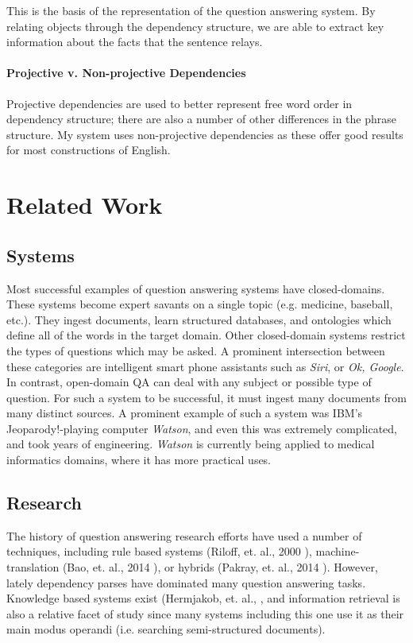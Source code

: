 \documentclass[twoside]{article}
\begin{document}
This is the basis of the representation of the question answering system.  By relating objects through the dependency structure, we are able to extract key information about the facts that the sentence relays.

\paragraph{Projective v. Non-projective Dependencies} Projective dependencies are used to better represent free word order in dependency structure; there are also a number of other differences in the phrase structure.  My system uses non-projective dependencies as these offer good results for most constructions of English.

\section{Related Work}

\subsection{Systems}

Most successful examples of question answering systems have closed-domains.  These systems become expert savants on a single topic (e.g. medicine, baseball, etc.).  They ingest documents, learn structured databases, and ontologies which define all of the words in the target domain.  Other closed-domain systems restrict the types of questions which may be asked.  A prominent intersection between these categories are intelligent smart phone assistants such as \textit{Siri}, or \textit{Ok, Google}.  In contrast, open-domain QA can deal with any subject or possible type of question.  For such a system to be successful, it must ingest many documents from many distinct sources. A prominent example of such a system was IBM's Jeoparody!-playing computer \textit{Watson}, and even this was extremely complicated, and took years of engineering.  \textit{Watson} is currently being applied to medical informatics domains, where it has more practical uses.


\subsection{Research}

The history of question answering research efforts have used a number of techniques, including rule based systems (Riloff, et. al., 2000 \cite{ril00}), machine-translation (Bao, et. al., 2014 \cite{bao14}), or hybrids (Pakray, et. al., 2014 \cite{pak11}). However, lately dependency parses have dominated many question answering tasks.  Knowledge based systems exist (Hermjakob, et. al., \cite{her02}, and information retrieval is also a relative facet of study since many systems including this one use it as their main modus operandi (i.e. searching semi-structured documents).
\end{document}
